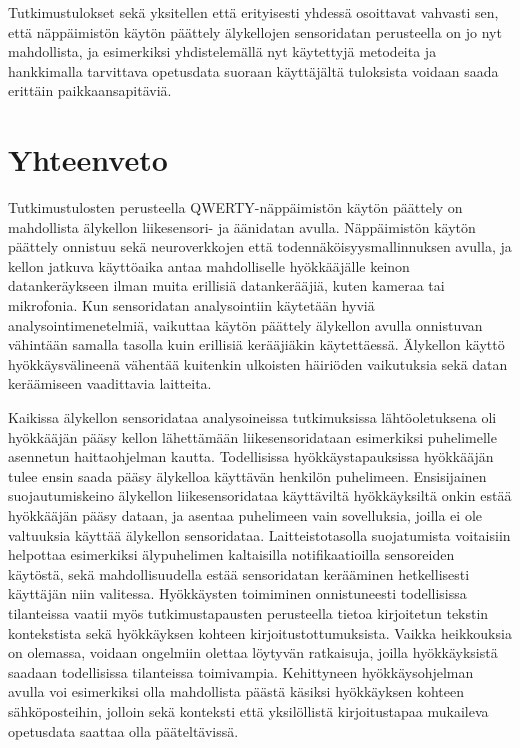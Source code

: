\documentclass[finnish]{tktltiki2}
\theoremstyle{definition}
\theoremstyle{remark}
\begin{document}
Tutkimustulokset sekä yksitellen että erityisesti yhdessä osoittavat vahvasti sen, että näppäimistön käytön päättely älykellojen sensoridatan perusteella on jo nyt mahdollista, ja esimerkiksi yhdistelemällä nyt käytettyjä metodeita ja hankkimalla tarvittava opetusdata suoraan käyttäjältä tuloksista voidaan saada erittäin paikkaansapitäviä.

\section{Yhteenveto}

Tutkimustulosten perusteella QWERTY-näppäimistön käytön päättely on mahdollista älykellon liikesensori- ja äänidatan avulla. Näppäimistön käytön päättely onnistuu sekä neuroverkkojen että todennäköisyysmallinnuksen avulla, ja kellon jatkuva käyttöaika antaa mahdolliselle hyökkääjälle keinon datankeräykseen ilman muita erillisiä datankerääjiä, kuten kameraa tai mikrofonia. Kun sensoridatan analysointiin käytetään hyviä analysointimenetelmiä, vaikuttaa käytön päättely älykellon avulla onnistuvan vähintään samalla tasolla kuin erillisiä kerääjiäkin käytettäessä. Älykellon käyttö hyökkäysvälineenä vähentää kuitenkin ulkoisten häiriöden vaikutuksia sekä datan keräämiseen vaadittavia laitteita. 

Kaikissa älykellon sensoridataa analysoineissa tutkimuksissa lähtöoletuksena oli hyökkääjän pääsy kellon lähettämään liikesensoridataan esimerkiksi puhelimelle asennetun haittaohjelman kautta. Todellisissa hyökkäystapauksissa hyökkääjän tulee ensin saada pääsy älykelloa käyttävän henkilön puhelimeen. Ensisijainen suojautumiskeino älykellon liikesensoridataa käyttäviltä hyökkäyksiltä onkin estää hyökkääjän pääsy dataan, ja asentaa puhelimeen vain sovelluksia, joilla ei ole valtuuksia käyttää älykellon sensoridataa. 
Laitteistotasolla suojatumista voitaisiin helpottaa esimerkiksi älypuhelimen kaltaisilla notifikaatioilla sensoreiden käytöstä, sekä mahdollisuudella estää sensoridatan kerääminen hetkellisesti käyttäjän niin valitessa. Hyökkäysten toimiminen onnistuneesti todellisissa tilanteissa vaatii myös tutkimustapausten perusteella tietoa kirjoitetun tekstin kontekstista sekä hyökkäyksen kohteen kirjoitustottumuksista. Vaikka heikkouksia on olemassa, voidaan ongelmiin olettaa löytyvän ratkaisuja, joilla hyökkäyksistä saadaan todellisissa tilanteissa toimivampia. Kehittyneen hyökkäysohjelman avulla voi esimerkiksi olla mahdollista päästä käsiksi hyökkäyksen kohteen sähköposteihin, jolloin sekä konteksti että yksilöllistä kirjoitustapaa mukaileva opetusdata saattaa olla pääteltävissä.
\end{document}
